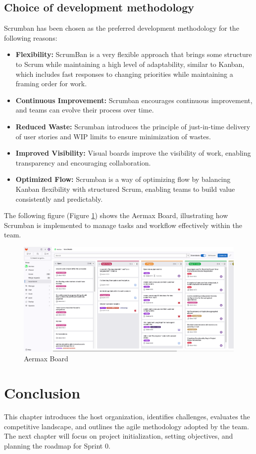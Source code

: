 \subsection{Choice of development methodology}
Scrumban has been chosen as the preferred development methodology for the following reasons:
\begin{itemize}
    \item \textbf{Flexibility:} ScrumBan is a very flexible approach that brings some structure to Scrum while maintaining a high level of adaptability, similar to Kanban, which includes fast responses to changing priorities while maintaining a framing order for work.
    \item \textbf{Continuous Improvement:} Scrumban encourages continuous improvement, and teams can evolve their process over time.
    \item \textbf{Reduced Waste:} Scrumban introduces the principle of just-in-time delivery of user stories and WIP limits to ensure minimization of wastes.
    \item \textbf{Improved Visibility:} Visual boards improve the visibility of work, enabling transparency and encouraging collaboration.
    \item \textbf{Optimized Flow:} Scrumban is a way of optimizing flow by balancing Kanban flexibility with structured Scrum, enabling teams to build value consistently and predictably.
\end{itemize}
The following figure (Figure \ref{fig:armax-board}) shows the Aermax Board, illustrating how Scrumban is implemented to manage tasks and workflow effectively within the team.
\begin{figure}[H]
    \centering
    \includegraphics[width=1\textwidth]{src/assets/chapters/aermax-board.png}
    \caption{Aermax Board}
    \label{fig:armax-board}
\end{figure}

\setcounter{secnumdepth}{0} %
\section{Conclusion}
This chapter introduces the host organization, identifies challenges, evaluates the competitive landscape, and outlines the agile methodology adopted by the team. The next chapter will focus on project initialization, setting objectives, and planning the roadmap for Sprint 0.
